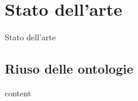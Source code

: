 \section{Stato dell'arte}
\begin{frame}{Stato dell'arte}
	
\end{frame}

\subsection{Riuso delle ontologie}
\begin{frame}
	content
\end{frame}